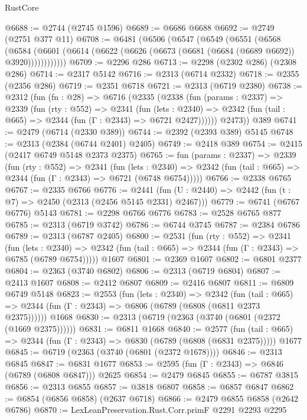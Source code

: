 \begin{lexlean}{RustCore}
\begin{coremodule}
@6688 := @2744 (@2745 @1596)
@6689 := @6686 @6688
@6692 := @2749 (@2751 @377 @11)
@6708 := @6481
    (@6506
      (@6547
        (@6549
          (@6551
            (@6568
              (@6584
                (@6601 (@6614 (@6622 (@6626 (@6673 (@6681 (@6684 (@6689 @6692)) @3920))))))))))))
@6709 := @2296 @286
@6713 := @2298 (@2302 @286) (@2308 @286)
@6714 := @2317 @5142
@6716 := @2313 (@6714 @2332)
@6718 := @2355 (@2356 @286)
@6719 := @2351 @6718
@6721 := @2313 (@6719 @2380)
@6738 := @2312
    (fun (fn : @28) =>
    @6716
      (@2335
        (@2338
          (fun (params : @2337) =>
          @2339
            (fun (rty : @552) =>
            @2341
              (fun (lets : @2340) =>
              @2342 (fun (tail : @665) => @2344 (fun (Γ : @2343) => @6721 @2427))))))
        @2473))
    @389
@6741 := @2479 (@6714 (@2330 @389))
@6744 := @2392 (@2393 @389) @5145
@6748 := @2313 (@2384 (@6744 @2401) @2405)
@6749 := @2418 @389
@6754 := @2415 (@2417 @6749 @5148 @2373 @2375)
@6765 := fun (params : @2337) =>
  @2339
    (fun (rty : @552) =>
    @2341
      (fun (lets : @2340) =>
      @2342 (fun (tail : @665) => @2344 (fun (Γ : @2343) => @6721 (@6748 @6754)))))
@6766 := @2338 @6765
@6767 := @2335 @6766
@6776 := @2441 (fun (U : @2440) => @2442 (fun (t : @7) => @2450 (@2313 (@2456 @5145 @2331) @2467)))
@6779 := @6741 (@6767 @6776) @5143
@6781 := @2298 @6766 @6776
@6783 := @2528 @6765 @877
@6785 := @2313 (@6719 @3742)
@6786 := @6744 @3745
@6787 := @2384 @6786
@6789 := @2313 (@6787 @2405)
@6800 := @2531
    (fun (rty : @552) =>
    @2341
      (fun (lets : @2340) =>
      @2342 (fun (tail : @665) => @2344 (fun (Γ : @2343) => @6785 (@6789 @6754)))))
    @1607
@6801 := @2369 @1607
@6802 := @6801 @2377
@6804 := @2363 (@3740 @6802)
@6806 := @2313 (@6719 @6804)
@6807 := @2413 @1607
@6808 := @2412 @6807
@6809 := @2416 @6807
@6811 := @6809 @6749 @5148
@6823 := @2553
    (fun (lets : @2340) =>
    @2342
      (fun (tail : @665) => @2344 (fun (Γ : @2343) => @6806 (@6789 (@6808 (@6811 @2373 @2375))))))
    @1668
@6830 := @2313 (@6719 (@2363 (@3740 (@6801 (@2372 (@1669 @2375))))))
@6831 := @6811 @1668
@6840 := @2577
    (fun (tail : @665) => @2344 (fun (Γ : @2343) => @6830 (@6789 (@6808 (@6831 @2375)))))
    @1677
@6845 := @6719 (@2363 (@3740 (@6801 (@2372 @1678))))
@6846 := @2313 @6845
@6847 := @6831 @1677
@6853 := @2595 (fun (Γ : @2343) => @6846 (@6789 (@6808 @6847))) @2625
@6854 := @2479 @6845
@6855 := @6787 @3815
@6856 := @2313 @6855
@6857 := @3818 @6807
@6858 := @6857 @6847
@6862 := @6854 (@6856 @6858) (@2637 @6718)
@6866 := @2479 @6855 @6858 (@2642 @6786)
@6870 := LexLeanPreservation.Rust.Corr.primF @2291 @2293 @2295

\end{coremodule}
\end{lexlean}
